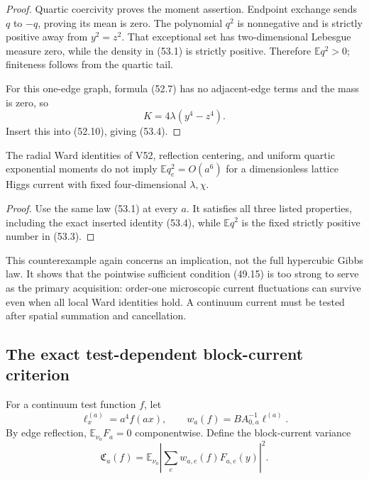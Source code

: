 \documentclass[11pt]{article}
\theoremstyle{remark}
\begin{document}
\begin{proof}
Quartic coercivity proves the moment assertion.  Endpoint exchange
sends \(q\) to \(-q\), proving its mean is zero.  The polynomial
\(q^2\) is nonnegative and is strictly positive away from
\(y^2=z^2\).  That exceptional set has two-dimensional Lebesgue
measure zero, while the density in (53.1) is strictly positive.
Therefore \(\mathbb E q^2>0\); finiteness follows from the quartic
tail.

For this one-edge graph, formula (52.7) has no adjacent-edge terms and
the mass is zero, so
\[
 K=4\lambda(y^4-z^4).
\]
Insert this into (52.10), giving (53.4).
\end{proof}

\begin{countertheorem}
\label{ctr:v17v53-local}
The radial Ward identities of V52, reflection centering, and uniform
quartic exponential moments do not imply
\(\mathbb E q_e^2=O(a^6)\) for a dimensionless lattice Higgs current
with fixed four-dimensional \(\lambda,\chi\).
\end{countertheorem}

\begin{proof}
Use the same law (53.1) at every \(a\).  It satisfies all three listed
properties, including the exact inserted identity (53.4), while
\(\mathbb E q^2\) is the fixed strictly positive number in (53.3).
\end{proof}

This counterexample again concerns an implication, not the full
hypercubic Gibbs law.  It shows that the pointwise sufficient
condition (49.15) is too strong to serve as the primary acquisition:
order-one microscopic current fluctuations can survive even when all
local Ward identities hold.  A continuum current must be tested after
spatial summation and cancellation.

\subsection{The exact test-dependent block-current criterion}

For a continuum test function \(f\), let
\[
 \ell_x^{(a)}=a^4f(ax),\qquad
 w_a(f)=BA_{0,a}^{-1}\ell^{(a)}.                  \tag{53.5}
\]
By edge reflection, \(\mathbb E_{\nu_a}F_a=0\) componentwise.
Define the block-current variance
\[
 \mathfrak C_a(f)
 =
 \mathbb E_{\nu_a}
 \left|
 \sum_ew_{a,e}(f)F_{a,e}(y)
 \right|^2.                                      \tag{53.6}
\]
\end{document}
